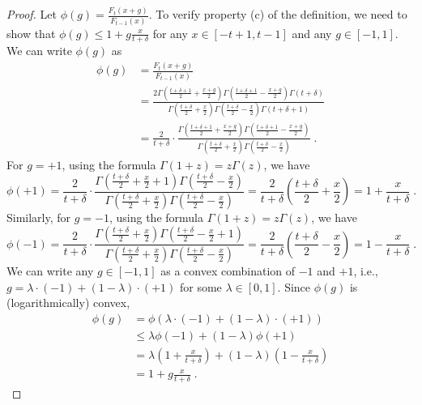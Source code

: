 \begin{proof}
Let $\phi(g) = \frac{F_t(x+g)}{F_{t-1}(x)}$. To verify property (c) of the definition,
we need to show that $\phi(g) \le 1 + g \frac{x}{t+\delta}$
for any $x \in [-t+1, t-1]$ and any $g \in [-1,1]$. We can write $\phi(g)$ as
\begin{align*}
\phi(g)
& = \frac{F_t(x+g)}{F_{t-1}(x)} \\
& = \frac{2 \Gamma(\frac{t+\delta+1}{2} + \frac{x+g}{2}) \Gamma(\frac{t+\delta+1}{2} - \frac{x+g}{2}) \Gamma(t + \delta)}{\Gamma(\frac{t+\delta}{2} + \frac{x}{2}) \Gamma(\frac{t+\delta}{2} - \frac{x}{2}) \Gamma(t+\delta+1)} \\
& = \frac{2}{t+\delta} \cdot \frac{\Gamma(\frac{t+\delta+1}{2} + \frac{x+g}{2}) \Gamma(\frac{t+\delta+1}{2} - \frac{x+g}{2})}{\Gamma(\frac{t+\delta}{2} + \frac{x}{2}) \Gamma(\frac{t+\delta}{2} - \frac{x}{2})} \; .
\end{align*}
For $g=+1$, using the formula $\Gamma(1+z) = z \Gamma(z)$, we have
\[
\phi(+1)
= \frac{2}{t+\delta} \cdot \frac{\Gamma(\frac{t+\delta}{2} + \frac{x}{2} + 1) \Gamma(\frac{t+\delta}{2} - \frac{x}{2})}{\Gamma(\frac{t+\delta}{2} + \frac{x}{2}) \Gamma(\frac{t+\delta}{2} - \frac{x}{2})}
= \frac{2}{t+\delta} \left(\frac{t+\delta}{2} + \frac{x}{2} \right)
= 1 + \frac{x}{t+\delta} \; .
\]
Similarly, for $g=-1$, using the formula $\Gamma(1+z) = z \Gamma(z)$, we have
\[
\phi(-1)
= \frac{2}{t+\delta} \cdot \frac{\Gamma(\frac{t+\delta}{2} + \frac{x}{2}) \Gamma(\frac{t+\delta}{2} - \frac{x}{2} + 1)}{\Gamma(\frac{t+\delta}{2} + \frac{x}{2}) \Gamma(\frac{t+\delta}{2} - \frac{x}{2})}
= \frac{2}{t+\delta} \left(\frac{t+\delta}{2} - \frac{x}{2} \right)
= 1 - \frac{x}{t+\delta} \; .
\]
We can write any $g \in [-1,1]$ as a convex combination of $-1$ and $+1$, i.e.,
$g = \lambda \cdot (-1) + (1-\lambda) \cdot (+1)$ for some $\lambda \in [0,1]$.
Since $\phi(g)$ is (logarithmically) convex,
\begin{align*}
\phi(g)
& = \phi(\lambda \cdot (-1) + (1-\lambda) \cdot (+1)) \\
& \le \lambda \phi(-1) + (1-\lambda) \phi(+1) \\
& = \lambda \left(1 + \frac{x}{t+\delta}\right) + (1-\lambda) \left(1 - \frac{x}{t+\delta}\right) \\
& = 1 + g \frac{x}{t+\delta} \; .
\end{align*}
\end{proof}

